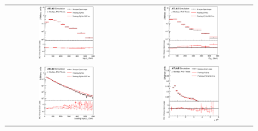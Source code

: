 \begin{figure}[tp]
\begin{center}
\begin{tabular}{cc}
\includegraphics[width=0.48\textwidth]{Modeling/Figures/rw_tt1bq_top_pt.eps} &
\includegraphics[width=0.48\textwidth]{Modeling/Figures/rw_tt1bq_ttbar_pt.eps} \\
\includegraphics[width=0.48\textwidth]{Modeling/Figures/rw_tt1gbbq_q1_pt.eps} &
\includegraphics[width=0.48\textwidth]{Modeling/Figures/rw_ttbb_qq_dr.eps} \\

\end{tabular}
\end{center}
\end{figure}
